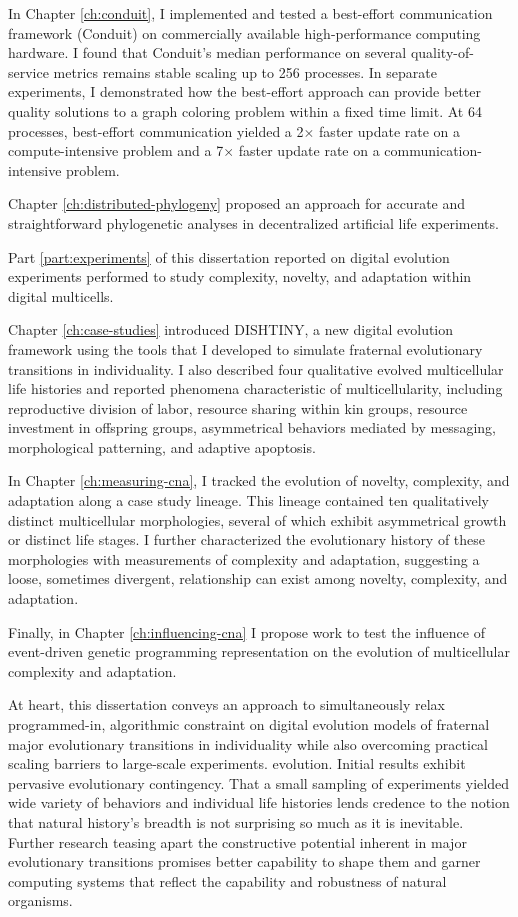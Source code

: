In Chapter \ref{ch:conduit}, I implemented and tested a best-effort communication framework (Conduit) on commercially available high-performance computing hardware.
I found that Conduit's median performance on several quality-of-service metrics remains stable scaling up to 256 processes.
In separate experiments, I demonstrated how the best-effort approach can provide better quality solutions to a graph coloring problem within a fixed time limit.
At 64 processes, best-effort communication yielded a 2$\times$ faster update rate on a compute-intensive problem and a 7$\times$ faster update rate on a communication-intensive problem.

Chapter \ref{ch:distributed-phylogeny} proposed an approach for accurate and straightforward phylogenetic analyses in decentralized artificial life experiments.

Part \ref{part:experiments} of this dissertation reported on digital evolution experiments performed to study complexity, novelty, and adaptation within digital multicells.

Chapter \ref{ch:case-studies} introduced DISHTINY, a new digital evolution framework using the tools that I developed to simulate fraternal evolutionary transitions in individuality.
I also described four qualitative evolved multicellular life histories and reported phenomena characteristic of multicellularity, including reproductive division of labor, resource sharing within kin groups, resource investment in offspring groups, asymmetrical behaviors mediated by messaging, morphological patterning, and adaptive apoptosis.

In Chapter \ref{ch:measuring-cna}, I tracked the evolution of novelty, complexity, and adaptation along a case study lineage.
This lineage contained ten qualitatively distinct multicellular morphologies, several of which exhibit asymmetrical growth or distinct life stages.
I further characterized the evolutionary history of these morphologies with measurements of complexity and adaptation, suggesting a loose, sometimes divergent, relationship can exist among novelty, complexity, and adaptation.

Finally, in Chapter \ref{ch:influencing-cna} I propose work to test the influence of event-driven genetic programming representation on the evolution of multicellular complexity and adaptation.

At heart, this dissertation conveys an approach to simultaneously relax programmed-in, algorithmic constraint on digital evolution models of fraternal major evolutionary transitions in individuality while also overcoming practical scaling barriers to large-scale experiments.
evolution.
Initial results exhibit pervasive evolutionary contingency.
That a small sampling of experiments yielded wide variety of behaviors and individual life histories lends credence to the notion that natural history's breadth is not surprising so much as it is inevitable.
Further research teasing apart the constructive potential inherent in major evolutionary transitions promises better capability to shape them and garner computing systems that reflect the capability and robustness of natural organisms.

